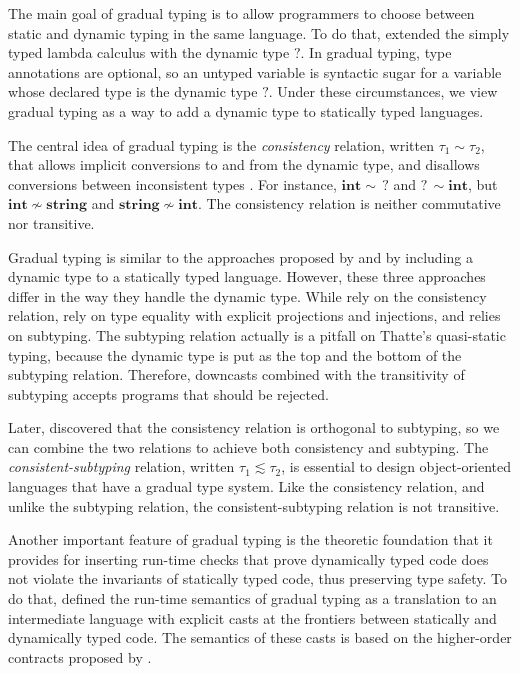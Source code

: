 \documentclass[preprint]{sig-alternate}
\begin{document}
The main goal of gradual typing \citep{siek2006gradual} is to allow
programmers to choose between static and dynamic typing in the same
language.
To do that, \citet{siek2006gradual} extended the simply typed
lambda calculus with the dynamic type $?$.
In gradual typing, type annotations are optional, so an untyped
variable is syntactic sugar for a variable whose declared type is
the dynamic type $?$.
Under these circumstances, we view gradual typing as a way to add
a dynamic type to statically typed languages.

The central idea of gradual typing is the \textit{consistency}
relation, written $\tau_{1} \sim \tau_{2}$, that allows implicit
conversions to and from the dynamic type, and disallows conversions
between inconsistent types \citep{siek2006gradual}.
For instance, $\mathbf{int} \sim \,?$ and $?\, \sim \mathbf{int}$,
but $\mathbf{int} \not\sim \mathbf{string}$ and
$\mathbf{string} \not\sim \mathbf{int}$. 
The consistency relation is neither commutative nor transitive.

Gradual typing is similar to the approaches proposed by
\citet{abadi1989dts} and \citet{thatte1990qst} by including a
dynamic type to a statically typed language.
However, these three approaches differ in the way they handle the
dynamic type.
While \citet{siek2006gradual} rely on the consistency relation,
\citet{abadi1989dts} rely on type equality with explicit projections
and injections, and \citet{thatte1990qst} relies on subtyping.
The subtyping relation actually is a pitfall on Thatte's quasi-static
typing, because the dynamic type is put as the top and the bottom of
the subtyping relation.
Therefore, downcasts combined with the transitivity of subtyping
accepts programs that should be rejected.

Later, \citet{siek2007objects} discovered that the consistency relation
is orthogonal to subtyping, so we can combine the two relations to
achieve both consistency and subtyping.
The \textit{consistent-subtyping} relation,
written $\tau_{1} \lesssim \tau_{2}$,
is essential to design object-oriented languages that have a
gradual type system.
Like the consistency relation, and unlike the subtyping relation,
the consistent-subtyping relation is not transitive.

Another important feature of gradual typing is the theoretic
foundation that it provides for inserting run-time checks that
prove dynamically typed code does not violate the invariants of
statically typed code, thus preserving type safety.
To do that, \citet{siek2006gradual} defined the run-time semantics
of gradual typing as a translation to an intermediate language with
explicit casts at the frontiers between statically and dynamically
typed code.
The semantics of these casts is based on the higher-order contracts
proposed by \citet{findler2002chf}.
\end{document}
